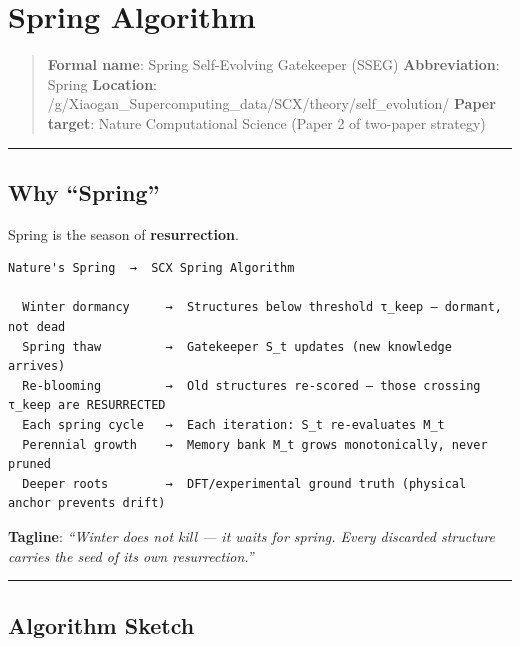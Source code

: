 \documentclass[
  12pt,
]{article}
\author{SCX}
\date{2026}
\begin{document}
\section{Spring Algorithm}\label{spring-algorithm-ux6625ux5b63ux7b97ux6cd5}

\begin{quote}
\textbf{Formal name}: Spring Self-Evolving Gatekeeper (SSEG)
\textbf{Abbreviation}: Spring \textbf{Location}:
/g/Xiaogan\_Supercomputing\_data/SCX/theory/self\_evolution/
\textbf{Paper target}: Nature Computational Science (Paper 2 of
two-paper strategy)
\end{quote}

\begin{center}\rule{0.5\linewidth}{0.5pt}\end{center}

\subsection{Why ``Spring''}\label{why-spring}

Spring is the season of \textbf{resurrection}.

\begin{verbatim}
Nature's Spring  →  SCX Spring Algorithm

  Winter dormancy     →  Structures below threshold τ_keep — dormant, not dead
  Spring thaw         →  Gatekeeper S_t updates (new knowledge arrives)
  Re-blooming         →  Old structures re-scored — those crossing τ_keep are RESURRECTED
  Each spring cycle   →  Each iteration: S_t re-evaluates M_t
  Perennial growth    →  Memory bank M_t grows monotonically, never pruned
  Deeper roots        →  DFT/experimental ground truth (physical anchor prevents drift)
\end{verbatim}

\textbf{Tagline}: \emph{``Winter does not kill --- it waits for spring.
Every discarded structure carries the seed of its own resurrection.''}

\begin{center}\rule{0.5\linewidth}{0.5pt}\end{center}

\subsection{Algorithm Sketch}\label{algorithm-sketch}
\end{document}
